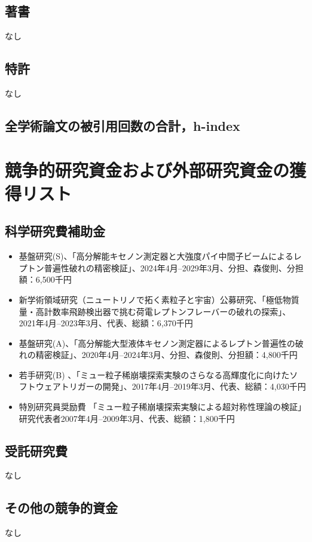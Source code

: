 \subsection{著書}
なし

\subsection{特許}
なし

\subsection{全学術論文の被引用回数の合計，h-index}

\newpage



\section{競争的研究資金および外部研究資金の獲得リスト}
\subsection{科学研究費補助金}
\begin{itemize}
  \setlength{\parskip}{0cm} %
  \setlength{\itemsep}{0cm} %
\item 基盤研究(S)、「高分解能キセノン測定器と大強度パイ中間子ビームによるレプトン普遍性破れの精密検証」、2024年4月--2029年3月、分担、森俊則、分担額：6,500千円
\item 新学術領域研究（ニュートリノで拓く素粒子と宇宙）公募研究、「極低物質量・高計数率飛跡検出器で挑む荷電レプトンフレーバーの破れの探索」、2021年4月--2023年3月、代表、総額：6,370千円
\item 基盤研究(A)、「高分解能大型液体キセノン測定器によるレプトン普遍性の破れの精密検証」、2020年4月--2024年3月、分担、森俊則、分担額：4,800千円
\item 若手研究(B) 、「ミュー粒子稀崩壊探索実験のさらなる高輝度化に向けたソフトウェアトリガーの開発」、2017年4月--2019年3月、代表、総額：4,030千円
\item 特別研究員奨励費 「ミュー粒子稀崩壊探索実験による超対称性理論の検証」研究代表者2007年4月--2009年3月、代表、総額：1,800千円
\end{itemize}

\subsection{受託研究費}
なし
\subsection{その他の競争的資金}
なし
